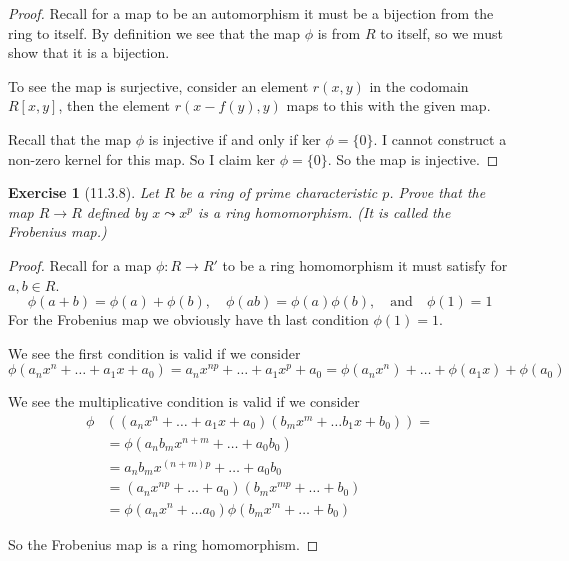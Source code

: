 \documentclass[12pt]{article}
\newtheorem*{exer}{Exercise}
\begin{document}
\begin{proof}

    Recall for a map to be an automorphism it must be a bijection from
    the ring to itself. By definition we see that the map $\phi$ is from
    $R$ to itself, so we must show that it is a bijection. 

    To see the map is surjective, consider an element $r(x, y)$ in the
    codomain $R[x, y]$, then the element $r(x - f(y), y)$ maps to this
    with the given map.

    Recall that the map $\phi$ is injective if and only if ker $\phi =
    \{0\}$. I cannot construct a non-zero kernel for this map. So I
    claim ker $\phi = \{0\}$. So the map is injective.

\end{proof}


\begin{exer}[11.3.8]

    Let $R$ be a ring of prime characteristic $p$. Prove that the map $R
    \rightarrow R$ defined by $x \leadsto x^p$ is a ring homomorphism.
    (It is called the \textit{Frobenius map}.)

\end{exer}

\begin{proof}

    Recall for a map $\phi: R \rightarrow R'$ to be a ring homomorphism
    it must satisfy for $a, b \in R$. 
    \[ 
        \phi(a + b) = \phi(a) + \phi(b), \quad \phi(ab) =
        \phi(a)\phi(b), \quad \text{and} \quad \phi(1) = 1
    \]
    For the Frobenius map we obviously have th last condition $\phi(1)
    = 1$.

    We see the first condition is valid if we consider
    \[
        \phi(a_n x^n + \dots + a_1 x + a_0) = a_n x^{np} + \dots + a_1
        x^p + a_0 = \phi(a_n x^n) + \dots + \phi(a_1 x) + \phi(a_0)
    \]

    We see the multiplicative condition is valid if we consider
    \begin{align*}
        \phi & \left(( a_n x^n + \dots + a_1 x + a_0)  (b_m x^m + \dots
        b_1 x + b_0)\right) = \\
        &= \phi(a_n b_m x^{n + m} + \dots + a_0 b_0) \\
        &= a_n b_m x^{(n + m)p} + \dots + a_0 b_0 \\
        &= (a_n x^{np} + \dots + a_0)(b_m x^{mp} + \dots + b_0) \\
        &= \phi(a_n x^n + \dots a_0)\phi(b_m x^m + \dots + b_0)
    \end{align*}

    So the Frobenius map is a ring homomorphism.

\end{proof}
\end{document}
